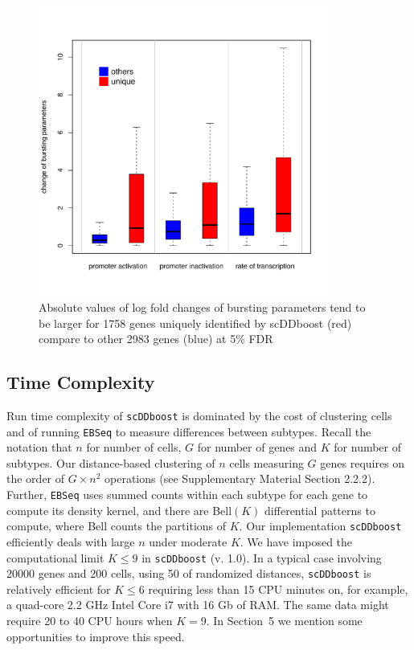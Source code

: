 \documentclass[aoas,preprint]{imsart}
\begin{document}
\begin{figure}[H]
\includegraphics[width = 0.85\textwidth]{Figs/D3E_box.pdf}
\caption{ Absolute values of log fold changes of bursting parameters tend to be larger for 1758 genes uniquely identified by scDDboost (red) compare to other 2983 genes (blue) at 5\% FDR}
 \label{fig:bursting}
\end{figure}


\subsection{Time Complexity}

Run time complexity of \texttt{scDDboost} is dominated by the cost of clustering cells and of running \texttt{EBSeq} to measure differences between subtypes. 
Recall the notation that $n$ for number of cells, $G$ for number of genes and $K$ for number of subtypes. 
Our distance-based clustering of  $n$ cells measuring $G$ genes requires on the order of $G \times n^2$ operations (see Supplementary Material Section 2.2.2).
Further, \texttt{EBSeq} uses summed counts within each subtype for each gene to compute its density kernel, and there are Bell$(K)$ differential patterns to compute,
where Bell counts the partitions of $K$.  
Our implementation \texttt{scDDboost} efficiently deals with large $n$ under moderate $K$.  We have imposed the computational limit  $K \leq 9$ in
 \verb+scDDboost+ (v. 1.0).  In a typical case involving 20000 genes and 200 cells,
 using 50 of randomized distances, \verb+scDDboost+  is relatively efficient for $K \leq 6$ requiring
 less than 15 CPU minutes on, for example, a quad-core 2.2 GHz Intel Core i7 with 16 Gb of RAM.
 The same data might require 20 to 40 CPU hours when $K=9$.  In Section~5 we mention some opportunities to improve this speed.
\end{document}

